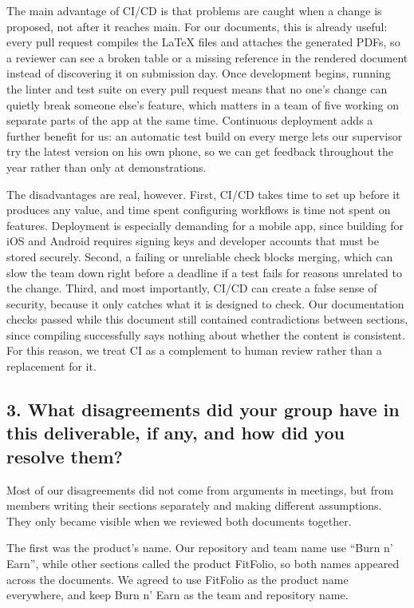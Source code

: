 \documentclass{article}
\begin{document}
The main advantage of CI/CD is that problems are caught when a change is proposed, not after it reaches main. For our documents, this is already useful: every pull request compiles the \LaTeX{} files and attaches the generated PDFs, so a reviewer can see a broken table or a missing reference in the rendered document instead of discovering it on submission day. Once development begins, running the linter and test suite on every pull request means that no one's change can quietly break someone else's feature, which matters in a team of five working on separate parts of the app at the same time. Continuous deployment adds a further benefit for us: an automatic test build on every merge lets our supervisor try the latest version on his own phone, so we can get feedback throughout the year rather than only at demonstrations.

The disadvantages are real, however. First, CI/CD takes time to set up before it produces any value, and time spent configuring workflows is time not spent on features. Deployment is especially demanding for a mobile app, since building for iOS and Android requires signing keys and developer accounts that must be stored securely. Second, a failing or unreliable check blocks merging, which can slow the team down right before a deadline if a test fails for reasons unrelated to the change. Third, and most importantly, CI/CD can create a false sense of security, because it only catches what it is designed to check. Our documentation checks passed while this document still contained contradictions between sections, since compiling successfully says nothing about whether the content is consistent. For this reason, we treat CI as a complement to human review rather than a replacement for it.

\subsection*{3. What disagreements did your group have in this deliverable, if any, and how did you resolve them?}

Most of our disagreements did not come from arguments in meetings, but from members writing their sections separately and making different assumptions. They only became visible when we reviewed both documents together.

The first was the product's name. Our repository and team name use ``Burn n' Earn'', while other sections called the product FitFolio, so both names appeared across the documents. We agreed to use FitFolio as the product name everywhere, and keep Burn n' Earn as the team and repository name.
\end{document}
